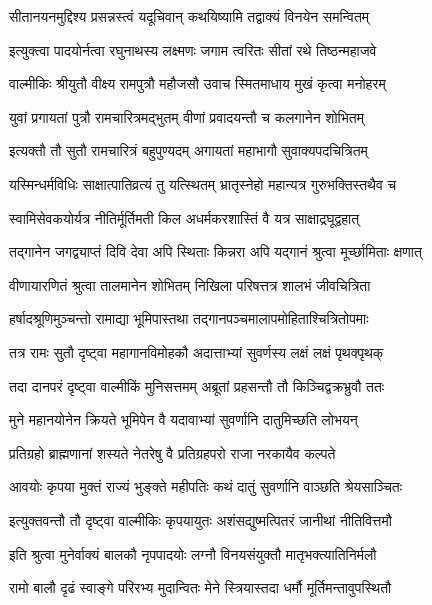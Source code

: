 \twolineshloka
{सीतानयनमुद्दिश्य प्रसन्नस्त्वं यदूचिवान्}
{कथयिष्यामि तद्वाक्यं विनयेन समन्वितम्}%

\twolineshloka
{इत्युक्त्वा पादयोर्नत्वा रघुनाथस्य लक्ष्मणः}
{जगाम त्वरितः सीतां रथे तिष्ठन्महाजवे}%

\twolineshloka
{वाल्मीकिः श्रीयुतौ वीक्ष्य रामपुत्रौ महौजसौ}
{उवाच स्मितमाधाय मुखं कृत्वा मनोहरम्}%

\twolineshloka
{युवां प्रगायतां पुत्रौ रामचारित्रमद्भुतम्}
{वीणां प्रवादयन्तौ च कलगानेन शोभितम्}%

\twolineshloka
{इत्यक्तौ तौ सुतौ रामचारित्रं बहुपुण्यदम्}
{अगायतां महाभागौ सुवाक्यपदचित्रितम्}%

\twolineshloka
{यस्मिन्धर्मविधिः साक्षात्पातिव्रत्यं तु यत्स्थितम्}
{भ्रातृस्नेहो महान्यत्र गुरुभक्तिस्तथैव च}%

\twolineshloka
{स्वामिसेवकयोर्यत्र नीतिर्मूर्तिमती किल}
{अधर्मकरशास्तिं वै यत्र साक्षाद्रघूद्वहात्}%

\twolineshloka
{तद्गानेन जगद्व्याप्तं दिवि देवा अपि स्थिताः}
{किन्नरा अपि यद्गानं श्रुत्वा मूर्च्छामिताः क्षणात्}%

\twolineshloka
{वीणायारणितं श्रुत्वा तालमानेन शोभितम्}
{निखिला परिषत्तत्र शालभं जीवचित्रिता}%

\twolineshloka
{हर्षादश्रूणिमुञ्चन्तो रामाद्या भूमिपास्तथा}
{तद्गानपञ्चमालापमोहिताश्चित्रितोपमाः}%

\twolineshloka
{तत्र रामः सुतौ दृष्ट्वा महागानविमोहकौ}
{अदात्ताभ्यां सुवर्णस्य लक्षं लक्षं पृथक्पृथक्}%

\twolineshloka
{तदा दानपरं दृष्ट्वा वाल्मीकिं मुनिसत्तमम्}
{अब्रूतां प्रहसन्तौ तौ किञ्चिद्वक्रभ्रुवौ ततः}%

\twolineshloka
{मुने महानयोनेन क्रियते भूमिपेन वै}
{यदावाभ्यां सुवर्णानि दातुमिच्छति लोभयन्}%

\twolineshloka
{प्रतिग्रहो ब्राह्मणानां शस्यते नेतरेषु वै}
{प्रतिग्रहपरो राजा नरकायैव कल्पते}%

\twolineshloka
{आवयोः कृपया मुक्तं राज्यं भुङ्क्ते महीपतिः}
{कथं दातुं सुवर्णानि वाञ्छति श्रेयसाञ्चितः}%

\twolineshloka
{इत्युक्तवन्तौ तौ दृष्ट्वा वाल्मीकिः कृपयायुतः}
{अशंसद्युष्मत्पितरं जानीथां नीतिवित्तमौ}%

\twolineshloka
{इति श्रुत्वा मुनेर्वाक्यं बालकौ नृपपादयोः}
{लग्नौ विनयसंयुक्तौ मातृभक्त्यातिनिर्मलौ}%

\twolineshloka
{रामो बालौ दृढं स्वाङ्गे परिरभ्य मुदान्वितः}
{मेने स्त्रियास्तदा धर्मौ मूर्तिमन्तावुपस्थितौ}%

